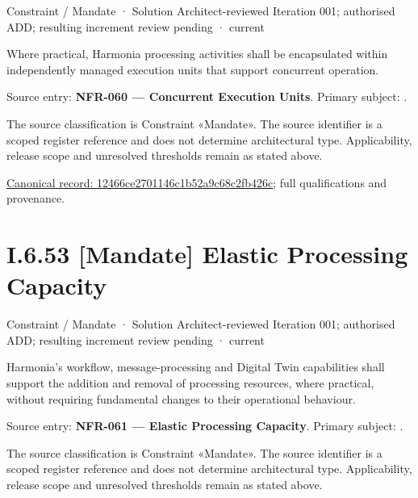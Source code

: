 \label{element:12466ce2701146c1b52a9c68c2fb426c}
{\small Constraint / Mandate · Solution Architect-reviewed Iteration 001; authorised ADD; resulting increment review pending · current}\par

Where practical, Harmonia processing activities shall be encapsulated within independently managed execution units that support concurrent operation.



Source entry: \textbf{NFR-060 — Concurrent Execution Units}. Primary subject: \texttt{}.



The source classification is Constraint «Mandate». The source identifier is a scoped register reference and does not determine architectural type. Applicability, release scope and unresolved thresholds remain as stated above.


{\footnotesize \href{../../../../../../../continuum/motivation/constraint/mandate/12466ce2701146c1b52a9c68c2fb426c.md}{Canonical record: 12466ce2701146c1b52a9c68c2fb426c}; full qualifications and provenance.}\par
\section*{I.6.53 [Mandate] Elastic Processing Capacity}
\label{navigation:I.6.53}

\label{element:ea33d8db942f4b5b9e322d74cbfe975b}
{\small Constraint / Mandate · Solution Architect-reviewed Iteration 001; authorised ADD; resulting increment review pending · current}\par

Harmonia's workflow, message-processing and Digital Twin capabilities shall support the addition and removal of processing resources, where practical, without requiring fundamental changes to their operational behaviour.



Source entry: \textbf{NFR-061 — Elastic Processing Capacity}. Primary subject: \texttt{}.



The source classification is Constraint «Mandate». The source identifier is a scoped register reference and does not determine architectural type. Applicability, release scope and unresolved thresholds remain as stated above.


